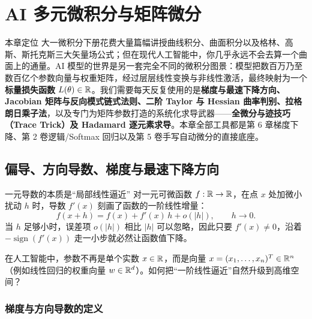 \chapter[AI 多元微积分与矩阵微分]{AI 多元微积分与矩阵微分}
\label{ch:multivar-matrix-calc}


\begin{chapIntro}{本章定位}
大一微积分下册花费大量篇幅讲授曲线积分、曲面积分以及格林、高斯、斯托克斯三大矢量场公式；但在现代人工智能中，你几乎永远不会去算一个曲面上的通量。AI 模型的世界是另一套完全不同的微积分图景：模型把数百万乃至数百亿个参数向量与权重矩阵，经过层层线性变换与非线性激活，最终映射为一个\textbf{标量损失函数} $L(\theta)\in\mathbb{R}$。我们需要每天反复使用的是\textbf{梯度与最速下降方向、Jacobian 矩阵与反向模式链式法则、二阶 Taylor 与 Hessian 曲率判别、拉格朗日乘子法}，以及专门为矩阵参数打造的系统化求导武器——\textbf{全微分与迹技巧（Trace Trick）及 Hadamard 逐元素求导}。本章全部工具都是第 6 章梯度下降、第 2 卷逻辑/Softmax 回归以及第 5 卷手写自动微分的直接底座。
\end{chapIntro}

\section{偏导、方向导数、梯度与最速下降方向}
\label{sec:ch5-grad}

\begin{recallBox}{一元导数的本质是“局部线性逼近”}
对一元可微函数 $f:\mathbb{R}\to\mathbb{R}$，在点 $x$ 处加微小扰动 $h$ 时，导数 $f'(x)$ 刻画了函数的一阶线性增量：
\[
  f(x + h) = f(x) + f'(x)\,h + o(|h|), \qquad h \to 0.
\]
当 $h$ 足够小时，误差项 $o(|h|)$ 相比 $|h|$ 可以忽略，因此只要 $f'(x)\neq 0$，沿着 $-\operatorname{sign}(f'(x))$ 走一小步就必然让函数值下降。
\end{recallBox}

在人工智能中，参数不再是单个实数 $x\in\mathbb{R}$，而是向量 $x = (x_1,\dots,x_n)^T \in \mathbb{R}^n$（例如线性回归的权重向量 $w\in\mathbb{R}^d$）。如何把“一阶线性逼近”自然升级到高维空间？

\subsection{梯度与方向导数的定义}

